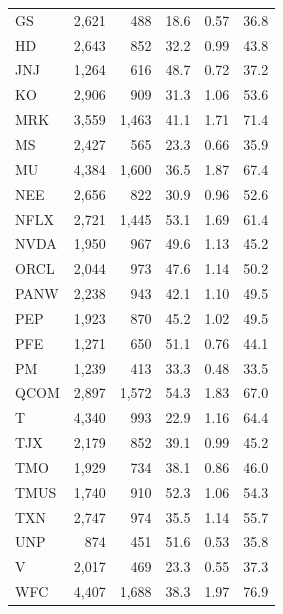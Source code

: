 \documentclass[12pt,a4paper]{article}
\begin{document}
\begin{longtable}{lrrrrr}
GS & 2{,}621 & 488 & 18.6 & 0.57 & 36.8 \\
HD & 2{,}643 & 852 & 32.2 & 0.99 & 43.8 \\
JNJ & 1{,}264 & 616 & 48.7 & 0.72 & 37.2 \\
KO & 2{,}906 & 909 & 31.3 & 1.06 & 53.6 \\
MRK & 3{,}559 & 1{,}463 & 41.1 & 1.71 & 71.4 \\
MS & 2{,}427 & 565 & 23.3 & 0.66 & 35.9 \\
MU & 4{,}384 & 1{,}600 & 36.5 & 1.87 & 67.4 \\
NEE & 2{,}656 & 822 & 30.9 & 0.96 & 52.6 \\
NFLX & 2{,}721 & 1{,}445 & 53.1 & 1.69 & 61.4 \\
NVDA & 1{,}950 & 967 & 49.6 & 1.13 & 45.2 \\
ORCL & 2{,}044 & 973 & 47.6 & 1.14 & 50.2 \\
PANW & 2{,}238 & 943 & 42.1 & 1.10 & 49.5 \\
PEP & 1{,}923 & 870 & 45.2 & 1.02 & 49.5 \\
PFE & 1{,}271 & 650 & 51.1 & 0.76 & 44.1 \\
PM & 1{,}239 & 413 & 33.3 & 0.48 & 33.5 \\
QCOM & 2{,}897 & 1{,}572 & 54.3 & 1.83 & 67.0 \\
T & 4{,}340 & 993 & 22.9 & 1.16 & 64.4 \\
TJX & 2{,}179 & 852 & 39.1 & 0.99 & 45.2 \\
TMO & 1{,}929 & 734 & 38.1 & 0.86 & 46.0 \\
TMUS & 1{,}740 & 910 & 52.3 & 1.06 & 54.3 \\
TXN & 2{,}747 & 974 & 35.5 & 1.14 & 55.7 \\
UNP & 874 & 451 & 51.6 & 0.53 & 35.8 \\
V & 2{,}017 & 469 & 23.3 & 0.55 & 37.3 \\
WFC & 4{,}407 & 1{,}688 & 38.3 & 1.97 & 76.9 \\
\end{longtable}
\end{document}
